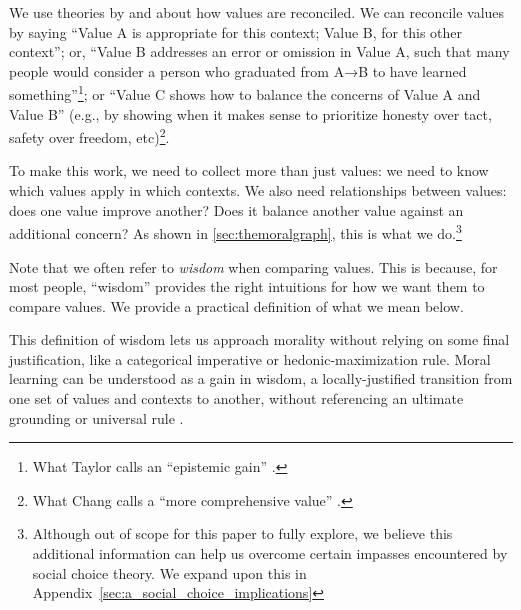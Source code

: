 \documentclass{article}
\theoremstyle{definition}
\newtheorem{definition}{Definition}[section]
\begin{document}
We use theories by \cite{Chang2004} and \cite{Taylor1989-TAYSOT} about how values are reconciled. We can reconcile values by saying “Value A is appropriate for this context; Value B, for this other context”; or, “Value B addresses an error or omission in Value A, such that many people would consider a person who graduated from A→B to have learned something”\footnote{What Taylor calls an “epistemic gain” \citep{Taylor1989-TAYSOT}.}; or “Value C shows how to balance the concerns of Value A and Value B” (e.g., by showing when it makes sense to prioritize honesty over tact, safety over freedom, etc)\footnote{What Chang calls a “more comprehensive value” \citep{Chang2004}.}.

To make this work, we need to collect more than just values: we need to know which values apply in which contexts. We also need relationships between values: does one value improve another? Does it balance another value against an additional concern? As shown in \ref{sec:themoralgraph}, this is what we do.\footnote{Although out of scope for this paper to fully explore, we believe this additional information can help us overcome certain impasses encountered by social choice theory. We expand upon this in Appendix~\ref{sec:a_social_choice_implications}}

Note that we often refer to \textit{wisdom} when comparing values. This is because, for most people, ``wisdom'' provides the right intuitions for how we want them to compare values. We provide a practical definition of what we mean below. 


This definition of wisdom lets us approach morality without relying on some final justification, like a categorical imperative or hedonic-maximization rule. Moral learning can be understood as a gain in wisdom, a locally-justified transition from one set of values and contexts to another, without referencing an ultimate grounding or universal rule \citep{Taylor1995}.
\end{document}
